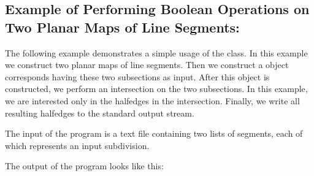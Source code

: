 \begin{ccTexOnly}
\subsection*{Example of Performing Boolean Operations on Two Planar Maps of Line Segments:}
The following example demonstrates a simple usage of the  class.
In this example we construct two planar maps of line segments. 
Then we construct a  object corresponds 
having these two subsections as input. 
After this object is constructed, we perform an intersection on the two subsections. 
In this example, we are interested only in the halfedges in the intersection.
Finally, we write all resulting halfedges to the standard output stream. 

The input of the program is a text file containing two lists of segments, 
each of which represents an input subdivision.

The output of the program looks like this:

\end{ccTexOnly}    







